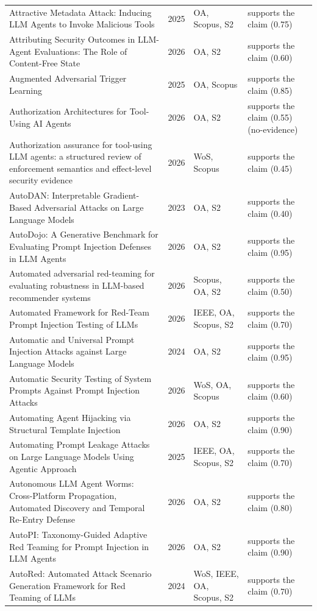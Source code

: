 \begin{longtable}{@{}%
  >{\raggedright\arraybackslash}p{}c%
  >{\raggedright\arraybackslash}p{}%
  >{\raggedright\arraybackslash}p{}@{}}
Attractive Metadata Attack: Inducing LLM Agents to Invoke Malicious Tools & 2025 & OA, Scopus, S2 & supports the claim (0.75) \\
Attributing Security Outcomes in LLM-Agent Evaluations: The Role of Content-Free State & 2026 & OA, S2 & supports the claim (0.60) \\
Augmented Adversarial Trigger Learning & 2025 & OA, Scopus & supports the claim (0.85) \\
Authorization Architectures for Tool-Using AI Agents & 2026 & OA, S2 & supports the claim (0.55) (no-evidence) \\
Authorization assurance for tool-using LLM agents: a structured review of enforcement semantics and effect-level security evidence & 2026 & WoS, Scopus & supports the claim (0.45) \\
AutoDAN: Interpretable Gradient-Based Adversarial Attacks on Large Language Models & 2023 & OA, S2 & supports the claim (0.40) \\
AutoDojo: A Generative Benchmark for Evaluating Prompt Injection Defenses in LLM Agents & 2026 & OA, S2 & supports the claim (0.95) \\
Automated adversarial red-teaming for evaluating robustness in LLM-based recommender systems & 2026 & Scopus, OA, S2 & supports the claim (0.50) \\
Automated Framework for Red-Team Prompt Injection Testing of LLMs & 2026 & IEEE, OA, Scopus, S2 & supports the claim (0.70) \\
Automatic and Universal Prompt Injection Attacks against Large Language Models & 2024 & OA, S2 & supports the claim (0.95) \\
Automatic Security Testing of System Prompts Against Prompt Injection Attacks & 2026 & WoS, OA, Scopus & supports the claim (0.60) \\
Automating Agent Hijacking via Structural Template Injection & 2026 & OA, S2 & supports the claim (0.90) \\
Automating Prompt Leakage Attacks on Large Language Models Using Agentic Approach & 2025 & IEEE, OA, Scopus, S2 & supports the claim (0.70) \\
Autonomous LLM Agent Worms: Cross-Platform Propagation, Automated Discovery and Temporal Re-Entry Defense & 2026 & OA, S2 & supports the claim (0.80) \\
AutoPI: Taxonomy-Guided Adaptive Red Teaming for Prompt Injection in LLM Agents & 2026 & OA, S2 & supports the claim (0.90) \\
AutoRed: Automated Attack Scenario Generation Framework for Red Teaming of LLMs & 2024 & WoS, IEEE, OA, Scopus, S2 & supports the claim (0.70) \\

\end{longtable}
